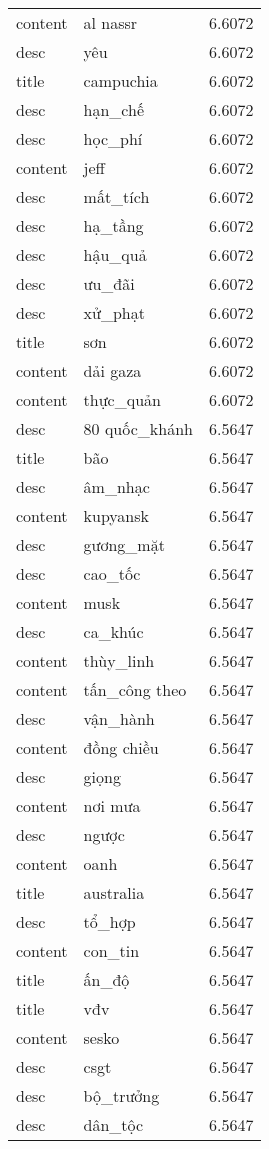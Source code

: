 \documentclass{article}
\begin{document}
\begin{tabular}{lll}
content & al nassr & 6.6072\\
desc & yêu & 6.6072\\
title & campuchia & 6.6072\\
desc & hạn\_chế & 6.6072\\
desc & học\_phí & 6.6072\\
content & jeff & 6.6072\\
desc & mất\_tích & 6.6072\\
desc & hạ\_tầng & 6.6072\\
desc & hậu\_quả & 6.6072\\
desc & ưu\_đãi & 6.6072\\
desc & xử\_phạt & 6.6072\\
title & sơn & 6.6072\\
content & dải gaza & 6.6072\\
content & thực\_quản & 6.6072\\
desc & 80 quốc\_khánh & 6.5647\\
title & bão & 6.5647\\
desc & âm\_nhạc & 6.5647\\
content & kupyansk & 6.5647\\
desc & gương\_mặt & 6.5647\\
desc & cao\_tốc & 6.5647\\
content & musk & 6.5647\\
desc & ca\_khúc & 6.5647\\
content & thùy\_linh & 6.5647\\
content & tấn\_công theo & 6.5647\\
desc & vận\_hành & 6.5647\\
content & đồng chiều & 6.5647\\
desc & giọng & 6.5647\\
content & nơi mưa & 6.5647\\
desc & ngược & 6.5647\\
content & oanh & 6.5647\\
title & australia & 6.5647\\
desc & tổ\_hợp & 6.5647\\
content & con\_tin & 6.5647\\
title & ấn\_độ & 6.5647\\
title & vđv & 6.5647\\
content & sesko & 6.5647\\
desc & csgt & 6.5647\\
desc & bộ\_trưởng & 6.5647\\
desc & dân\_tộc & 6.5647\\

\end{tabular}
\end{document}
